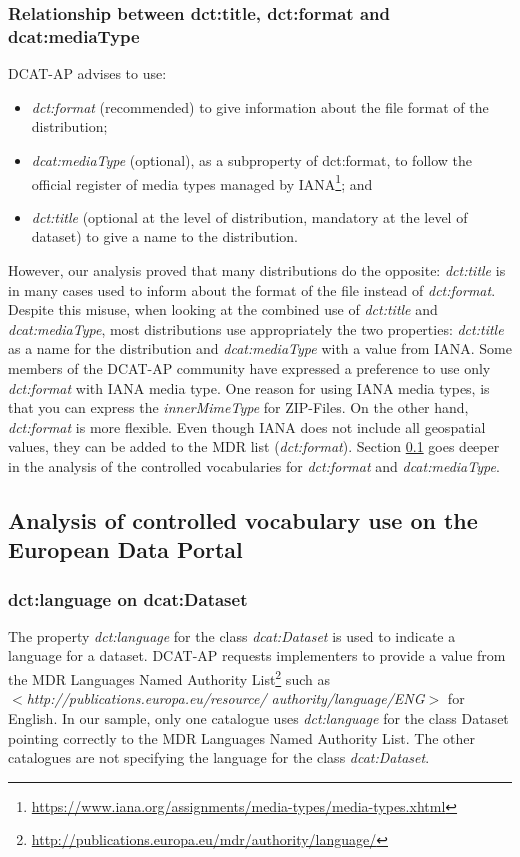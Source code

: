 \documentclass[<options>]{elsarticle}
\begin{document}
\subsubsection{Relationship between dct:title, dct:format and dcat:mediaType}
DCAT-AP advises to use:
\begin{itemize}
\item \textit{dct:format} (recommended) to give information about the file format of the distribution;
\item \textit{dcat:mediaType} (optional), as a subproperty of dct:format, to follow the official register of media types managed by IANA\footnote{\href{ https://www.iana.org/assignments/media-types/media-types.xhtml}{   https://www.iana.org/assignments/media-types/media-types.xhtml}}; and
\item \textit{dct:title} (optional at the level of distribution, mandatory at the level of dataset) to give a name to the distribution.
\end{itemize}

However, our analysis proved that many distributions do the opposite: \textit{dct:title} is in many cases used to inform about the format of the file instead of \textit{dct:format}. Despite this misuse, when looking at the combined use of \textit{dct:title} and \textit{dcat:mediaType}, most distributions use appropriately the two properties: \textit{dct:title} as a name for the distribution and \textit{dcat:mediaType} with a value from IANA. Some members of the DCAT-AP community have expressed a preference to use only \textit{dct:format} with IANA media type. One reason for using IANA media types, is that you can express the \textit{innerMimeType} for ZIP-Files. On the other hand, \textit{dct:format} is more flexible. Even though IANA does not include all geospatial values, they can be added to the MDR list (\textit{dct:format}). Section \ref{VocabularyAnalysis} goes deeper in the analysis of the controlled vocabularies for \textit{dct:format} and \textit{dcat:mediaType}. 

\subsection{Analysis of controlled vocabulary use on the European Data Portal} \label{VocabularyAnalysis}
\subsubsection{dct:language on dcat:Dataset}
The property \textit{dct:language} for the class \textit{dcat:Dataset} is used to indicate a language for a dataset. DCAT-AP requests implementers to provide a value from the MDR Languages Named Authority List\footnote{\href{   http://publications.europa.eu/mdr/authority/language/}{    http://publications.europa.eu/mdr/authority/language/}} such as \\
\textit{$<$http://publications.europa.eu/resource/ authority/language/ENG$>$} for English. In our sample, only one catalogue uses \textit{dct:language} for the class Dataset pointing correctly to the MDR Languages Named Authority List. The other catalogues are not specifying the language for the class \textit{dcat:Dataset}.
\end{document}
